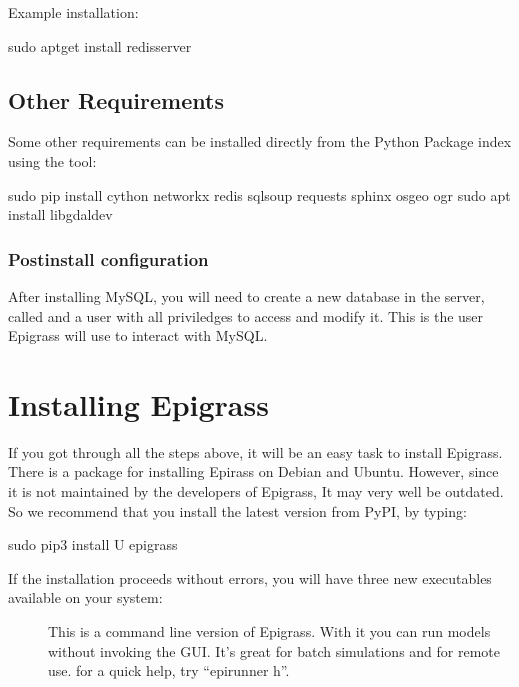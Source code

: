\documentclass[letterpaper,10pt,english]{sphinxmanual}
\begin{document}
Example installation:

\begin{sphinxVerbatim}[commandchars=\\\{\}]
\PYGZdl{} sudo apt\PYGZhy{}get install redis\PYGZhy{}server
\end{sphinxVerbatim}


\subsection{Other Requirements}
\label{\detokenize{install:other-requirements}}
Some other requirements can be installed directly from the Python Package index using the  tool:

\begin{sphinxVerbatim}[commandchars=\\\{\}]
\PYGZdl{} sudo pip install  cython networkx redis sqlsoup requests sphinx osgeo ogr
\PYGZdl{} sudo apt install libgdal\PYGZhy{}dev
\end{sphinxVerbatim}


\subsubsection{Post\sphinxhyphen{}install configuration}
\label{\detokenize{install:post-install-configuration}}
After installing MySQL, you will need to create a new database in the server, called  and a user with all priviledges to access and modify it. This is the user Epigrass will use to interact with MySQL.


\section{Installing Epigrass}
\label{\detokenize{install:installing-epigrass}}
If you got through all the steps above, it will be an easy task to install Epigrass.
There is a  package for installing Epirass on Debian and Ubuntu. However, since it is not maintained by the developers of Epigrass, It may very well be outdated.  So we recommend that you install the latest version from PyPI,  by typing:

\begin{sphinxVerbatim}[commandchars=\\\{\}]
\PYGZdl{} sudo pip3 install \PYGZhy{}U epigrass
\end{sphinxVerbatim}

If the installation proceeds without errors, you will have three new executables available on your system:
\begin{description}
\item[{}] \leavevmode
This is a command line version of Epigrass. With it you can run models without invoking the GUI. It’s great for batch simulations and for remote use. for a quick help, try “epirunner \sphinxhyphen{}h”.

\end{description}
\end{document}
